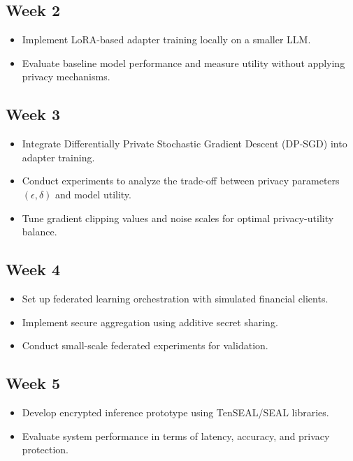 \documentclass[12pt,a4paper]{report}
\begin{document}
\subsection*{Week 2}
\begin{itemize}
    \item Implement LoRA-based adapter training locally on a smaller LLM.
    \item Evaluate baseline model performance and measure utility without applying privacy mechanisms.
\end{itemize}

\subsection*{Week 3}
\begin{itemize}
    \item Integrate Differentially Private Stochastic Gradient Descent (DP-SGD) into adapter training.
    \item Conduct experiments to analyze the trade-off between privacy parameters $(\epsilon, \delta)$ and model utility.
    \item Tune gradient clipping values and noise scales for optimal privacy-utility balance.
\end{itemize}

\subsection*{Week 4}
\begin{itemize}
    \item Set up federated learning orchestration with simulated financial clients.
    \item Implement secure aggregation using additive secret sharing.
    \item Conduct small-scale federated experiments for validation.
\end{itemize}

\subsection*{Week 5}
\begin{itemize}
    \item Develop encrypted inference prototype using TenSEAL/SEAL libraries.
    \item Evaluate system performance in terms of latency, accuracy, and privacy protection.
\end{itemize}
\end{document}
